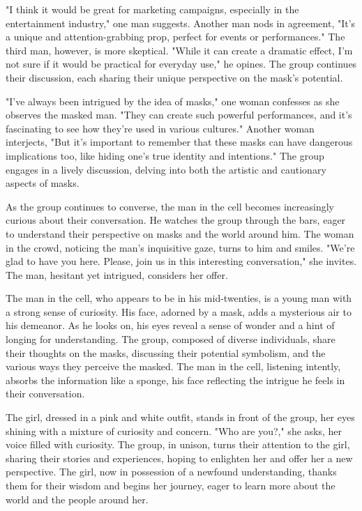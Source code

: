 \documentclass[smalldemyvopaper,11pt,twoside,onecolumn,openright,extrafontsizes]{memoir}
\begin{document}
"I think it would be great for marketing campaigns, especially in the entertainment industry," one man suggests. Another man nods in agreement, "It's a unique and attention-grabbing prop, perfect for events or performances." The third man, however, is more skeptical. "While it can create a dramatic effect, I'm not sure if it would be practical for everyday use," he opines. The group continues their discussion, each sharing their unique perspective on the mask's potential.\par
"I've always been intrigued by the idea of masks," one woman confesses as she observes the masked man. "They can create such powerful performances, and it's fascinating to see how they're used in various cultures." Another woman interjects, "But it's important to remember that these masks can have dangerous implications too, like hiding one's true identity and intentions." The group engages in a lively discussion, delving into both the artistic and cautionary aspects of masks.\par
As the group continues to converse, the man in the cell becomes increasingly curious about their conversation. He watches the group through the bars, eager to understand their perspective on masks and the world around him. The woman in the crowd, noticing the man's inquisitive gaze, turns to him and smiles. "We're glad to have you here. Please, join us in this interesting conversation," she invites. The man, hesitant yet intrigued, considers her offer.\par
The man in the cell, who appears to be in his mid-twenties, is a young man with a strong sense of curiosity. His face, adorned by a mask, adds a mysterious air to his demeanor. As he looks on, his eyes reveal a sense of wonder and a hint of longing for understanding. The group, composed of diverse individuals, share their thoughts on the masks, discussing their potential symbolism, and the various ways they perceive the masked. The man in the cell, listening intently, absorbs the information like a sponge, his face reflecting the intrigue he feels in their conversation.\par
The girl, dressed in a pink and white outfit, stands in front of the group, her eyes shining with a mixture of curiosity and concern. "Who are you?," she asks, her voice filled with curiosity. The group, in unison, turns their attention to the girl, sharing their stories and experiences, hoping to enlighten her and offer her a new perspective. The girl, now in possession of a newfound understanding, thanks them for their wisdom and begins her journey, eager to learn more about the world and the people around her.\par
\end{document}
